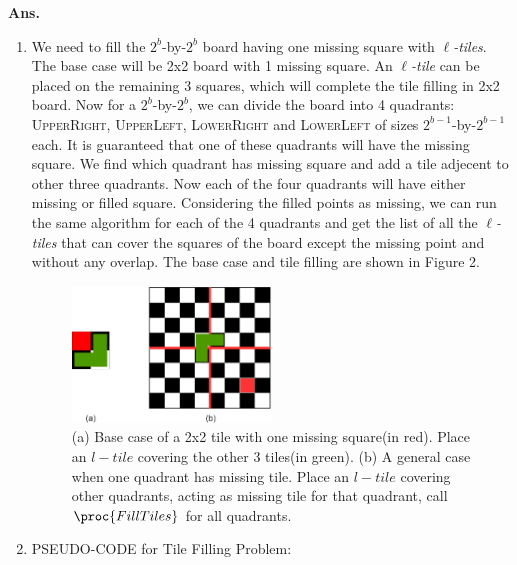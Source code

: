 \documentclass[11pt]{article}
\begin{document}
\noindent \textbf{Ans.}
\begin{enumerate}
\item We need to fill the $2^b$-by-$2^b$ board having one missing square with {\em $\ell$-tiles}. The base case will be 2x2 board with 1 missing square. An {\em $\ell$-tile} can be placed on the remaining 3 squares, which will complete the tile filling in 2x2 board. Now for a $2^b$-by-$2^b$, we can divide the board into 4 quadrants: \textsc{UpperRight}, \textsc{UpperLeft}, \textsc{LowerRight} and \textsc{LowerLeft} of sizes $2^{b-1}$-by-$2^{b-1}$ each. It is guaranteed that one of these quadrants will have the missing square. We find which quadrant has missing square and add a tile adjecent to other three quadrants. Now each of the four quadrants will have either missing or filled square. Considering the filled points as missing, we can run the same algorithm for each of the 4 quadrants and get the list of all the {\em $\ell$-tiles} that can cover the squares of the board except the missing point and without any overlap. The base case and tile filling are shown in Figure 2.

\begin{figure}[h!]
\begin{center}
\includegraphics[width=0.5\textwidth]{Q2.png}
\caption{(a) Base case of a 2x2 tile with one missing square(in red). Place an $l-tile$ covering the other 3 tiles(in green). (b) A general case when one quadrant has missing tile. Place an $l-tile$ covering other quadrants, acting as missing tile for that quadrant, call $\proc{FillTiles}$ for all quadrants.}
\end{center}
\end{figure}
\item PSEUDO-CODE for Tile Filling Problem:
    

\end{enumerate}
\end{document}
